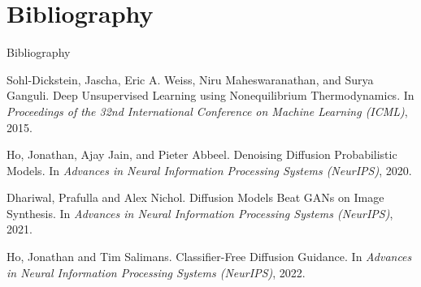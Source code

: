 \documentclass[11pt]{beamer}
\begin{document}
\section{Bibliography}
\begin{frame}{Bibliography}
  
  
  Sohl-Dickstein, Jascha, Eric A. Weiss, Niru Maheswaranathan, and Surya Ganguli.
  \newblock Deep Unsupervised Learning using Nonequilibrium Thermodynamics.
  \newblock In {\em Proceedings of the 32nd International Conference on Machine Learning (ICML)}, 2015.
  
  Ho, Jonathan, Ajay Jain, and Pieter Abbeel.
  \newblock Denoising Diffusion Probabilistic Models.
  \newblock In {\em Advances in Neural Information Processing Systems (NeurIPS)}, 2020.
  
  Dhariwal, Prafulla and Alex Nichol.
  \newblock Diffusion Models Beat GANs on Image Synthesis.
  \newblock In {\em Advances in Neural Information Processing Systems (NeurIPS)}, 2021.
  
  Ho, Jonathan and Tim Salimans.
  \newblock Classifier-Free Diffusion Guidance.
  \newblock In {\em Advances in Neural Information Processing Systems (NeurIPS)}, 2022.
\end{frame}
\end{document}
